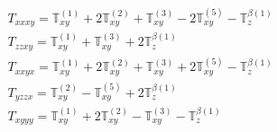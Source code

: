 \documentclass[fleqn,8pt,landscape]{jsarticle}
\begin{document}
\begin{align*}
& T_{xxxy} = \mathbb{T}_{xy}^{(1)} + 2 \mathbb{T}_{xy}^{(2)} + \mathbb{T}_{xy}^{(3)} - 2 \mathbb{T}_{xy}^{(5)} - \mathbb{T}_{z}^{\beta(1)} \\
& T_{zzxy} = \mathbb{T}_{xy}^{(1)} + \mathbb{T}_{xy}^{(3)} + 2 \mathbb{T}_{z}^{\beta(1)} \\
& T_{xxyx} = \mathbb{T}_{xy}^{(1)} + 2 \mathbb{T}_{xy}^{(2)} + \mathbb{T}_{xy}^{(3)} + 2 \mathbb{T}_{xy}^{(5)} - \mathbb{T}_{z}^{\beta(1)} \\
& T_{yzzx} = \mathbb{T}_{xy}^{(2)} - \mathbb{T}_{xy}^{(5)} + 2 \mathbb{T}_{z}^{\beta(1)} \\
& T_{xyyy} = \mathbb{T}_{xy}^{(1)} + 2 \mathbb{T}_{xy}^{(2)} - \mathbb{T}_{xy}^{(3)} - \mathbb{T}_{z}^{\beta(1)}
\end{align*}
\end{document}
